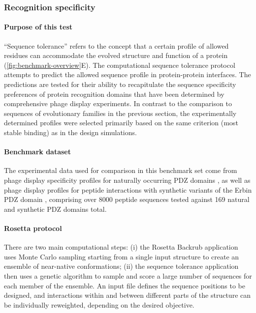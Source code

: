 \subsubsection{Recognition specificity}

\paragraph{Purpose of this test}

``Sequence tolerance'' refers to the concept that a certain profile of allowed residues can accommodate the evolved structure and function of a protein (\cref{fig:benchmark-overview}E). The computational sequence tolerance protocol attempts to predict the allowed sequence profile in protein-protein interfaces. The predictions are tested for their ability to recapitulate the sequence specificity preferences of protein recognition domains that have been determined by comprehensive phage display experiments. In contrast to the comparison to sequences of evolutionary families in the previous section, the experimentally determined profiles were selected primarily based on the same criterion (most stable binding) as in the design simulations.

\paragraph{Benchmark dataset}
The experimental data used for comparison in this benchmark set come from phage display specificity profiles for naturally occurring PDZ domains \cite{tonikian_specificity_2008}, as well as phage display profiles for peptide interactions with synthetic variants of the Erbin PDZ domain \cite{tonikian_specificity_2008,ernst_rapid_2009}, comprising over 8000 peptide sequences tested against 169 natural and synthetic PDZ domains total.

\paragraph{Rosetta protocol}
There are two main computational steps: (i) the Rosetta Backrub application \cite{smith_backrub-like_2008} uses Monte Carlo sampling starting from a single input structure to create an ensemble of near-native conformations; (ii) the sequence tolerance application \cite{smith_predicting_2011,smith_structure-based_2010} then uses a genetic algorithm to sample and score a large number of sequences for each member of the ensemble. An input file defines the sequence positions to be designed, and interactions within and between different parts of the structure can be individually reweighted, depending on the desired objective.

